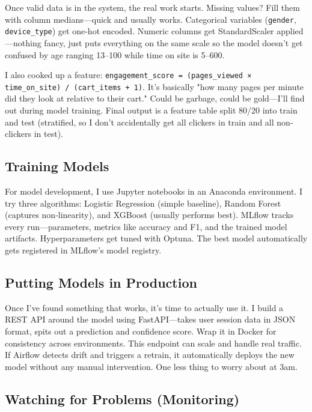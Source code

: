 \documentclass[11pt,a4paper]{article}
\begin{document}
Once valid data is in the system, the real work starts. Missing values? Fill them with column 
medians—quick and usually works. Categorical variables (\texttt{gender}, \texttt{device\_type}) 
get one-hot encoded. Numeric columns get StandardScaler applied—nothing fancy, just puts 
everything on the same scale so the model doesn't get confused by age ranging 13--100 while 
time on site is 5--600.

I also cooked up a feature: \texttt{engagement\_score = (pages\_viewed × time\_on\_site) / 
(cart\_items + 1)}. It's basically "how many pages per minute did they look at relative to 
their cart." Could be garbage, could be gold—I'll find out during model training. Final output 
is a feature table split 80/20 into train and test (stratified, so I don't accidentally get all 
clickers in train and all non-clickers in test).

\subsection{Training Models}

For model development, I use Jupyter notebooks in an Anaconda environment. I try three algorithms: 
Logistic Regression (simple baseline), Random Forest (captures non-linearity), and XGBoost 
(usually performs best). MLflow tracks every run—parameters, metrics like accuracy and F1, 
and the trained model artifacts. Hyperparameters get tuned with Optuna. The best model 
automatically gets registered in MLflow's model registry.

\subsection{Putting Models in Production}

Once I've found something that works, it's time to actually use it. I build a REST API around 
the model using FastAPI—takes user session data in JSON format, spits out a prediction and 
confidence score. Wrap it in Docker for consistency across environments. This endpoint can scale 
and handle real traffic. If Airflow detects drift and triggers a retrain, it automatically 
deploys the new model without any manual intervention. One less thing to worry about at 3am.

\subsection{Watching for Problems (Monitoring)}
\end{document}
